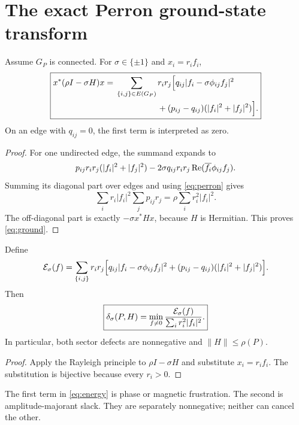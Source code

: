 \section{The exact Perron ground-state transform}
\label{sec:ground}

\begin{theorem}\label{thm:ground}
Assume \(G_P\) is connected.  For \(\sigma\in\{\pm1\}\) and
\(x_i=r_if_i\),
\begin{equation}\label{eq:ground}
\boxed{\begin{aligned}
x^*(\rho I-\sigma H)x
={}&
\sum_{\{i,j\}\in E(G_P)}r_ir_j
\Bigl[
q_{ij}|f_i-\sigma\phi_{ij}f_j|^2\\
&\hspace{5.0em}
+(p_{ij}-q_{ij})(|f_i|^2+|f_j|^2)
\Bigr].
\end{aligned}}
\end{equation}
On an edge with \(q_{ij}=0\), the first term is interpreted as zero.
\end{theorem}

\begin{proof}
For one undirected edge, the summand expands to
\[
 p_{ij}r_ir_j(|f_i|^2+|f_j|^2)
 -
 2\sigma q_{ij}r_ir_j
 \operatorname{Re}(\overline{f_i}\phi_{ij}f_j).
\]
Summing its diagonal part over edges and using \eqref{eq:perron} gives
\[
 \sum_i r_i|f_i|^2\sum_jp_{ij}r_j
 =
 \rho\sum_i r_i^2|f_i|^2.
\]
The off-diagonal part is exactly \(-\sigma x^*Hx\), because \(H\) is
Hermitian.  This proves \eqref{eq:ground}.
\end{proof}

\begin{corollary}\label{cor:variation}
Define
\begin{align}
 \mathcal E_\sigma(f)
 =
 \sum_{\{i,j\}}r_ir_j
 \Bigl[
 q_{ij}|f_i-\sigma\phi_{ij}f_j|^2
 +(p_{ij}-q_{ij})(|f_i|^2+|f_j|^2)
 \Bigr].
 \label{eq:energy}
\end{align}
Then
\begin{equation}\label{eq:variation}
 \boxed{\displaystyle
 \delta_\sigma(P,H)
 =
 \min_{f\ne0}
 \frac{\mathcal E_\sigma(f)}
      {\sum_i r_i^2|f_i|^2}.}
\end{equation}
In particular, both sector defects are nonnegative and
\(\|H\|\le\rho(P)\).
\end{corollary}

\begin{proof}
Apply the Rayleigh principle to \(\rho I-\sigma H\) and substitute
\(x_i=r_if_i\).  The substitution is bijective because every
\(r_i>0\).
\end{proof}

\begin{remark}
The first term in \eqref{eq:energy} is phase or magnetic frustration.
The second is amplitude-majorant slack.  They are separately
nonnegative; neither can cancel the other.
\end{remark}
